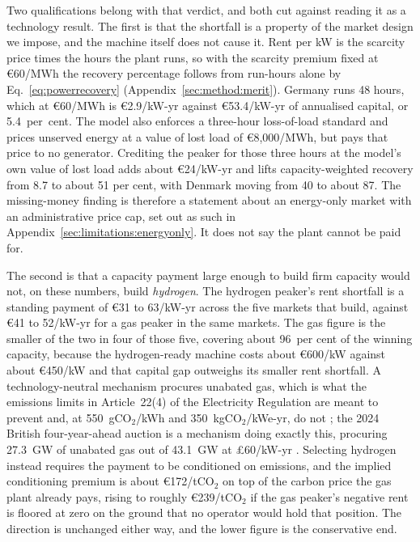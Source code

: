 Two qualifications belong with that verdict, and both cut against reading it as a
technology result. The first is that the shortfall is a property of the market design we impose,
and the machine itself does not cause it. Rent per kW is the scarcity price times the hours the plant runs, so with the scarcity
premium fixed at \euro{}60/MWh the recovery percentage follows from run-hours alone by
Eq.~\eqref{eq:powerrecovery} (Appendix~\ref{sec:method:merit}). Germany runs 48
hours, which at
\euro{}60/MWh is \euro{}2.9/kW-yr against \euro{}53.4/kW-yr of annualised capital, or
5.4~per~cent. The model also enforces a three-hour loss-of-load standard and prices
unserved energy at a value of lost load of \euro{}8{,}000/MWh, but pays that price to no
generator. Crediting the peaker for those three hours at the model's own value of lost
load adds about \euro{}24/kW-yr and lifts capacity-weighted recovery from 8.7 to about 51
per cent, with Denmark moving from 40 to about 87. The missing-money finding is therefore a statement about an energy-only market with an
administrative price cap, set out as such in Appendix~\ref{sec:limitations:energyonly}.
It does not say the plant cannot be paid for.

The second is that a capacity payment large enough to build firm capacity would not, on
these numbers, build \emph{hydrogen}. The hydrogen peaker's rent shortfall is a standing payment of \euro{}31 to 63/kW-yr across the five markets that build, against \euro{}41 to 52/kW-yr for a gas peaker in the same markets. The gas figure is the smaller of the two in four of those five, covering about 96~per cent of the winning capacity, because the hydrogen-ready machine costs about
\euro{}600/kW against about \euro{}450/kW and that capital gap outweighs its smaller rent
shortfall. A technology-neutral mechanism procures unabated gas, which is what the emissions limits in Article~22(4) of the Electricity Regulation are meant to prevent and, at 550~gCO$_2$/kWh and 350~kgCO$_2$/kWe-yr, do not \citep{EU2019ElectricityRegulation,ACER2023capacity}; the 2024 British four-year-ahead auction is a mechanism doing exactly this, procuring 27.3~GW of unabated gas out of 43.1~GW at \pounds{}60/kW-yr \citep{DESNZ2025T4auction}. Selecting hydrogen instead requires the payment to be conditioned on emissions, and the implied conditioning
premium is about \euro{}172/tCO$_2$ on top of the carbon price the gas plant already pays,
rising to roughly \euro{}239/tCO$_2$ if the gas peaker's negative rent is floored at zero
on the ground that no operator would hold that position. The direction is unchanged either
way, and the lower figure is the conservative end.

